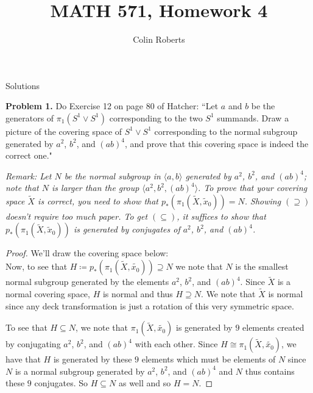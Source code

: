 \documentclass[leqno]{article}
\author{Colin Roberts}
\title{MATH 571, Homework 4}
\theoremstyle{nonumberplain}
\newtheorem{proof}{Proof}
\begin{document}
\maketitle
\begin{large}
\begin{center}
Solutions
\end{center}
\end{large}


\noindent\textbf{Problem 1.} 
Do Exercise 12 on page 80 of Hatcher: ``Let $a$ and $b$ be the generators of $\pi_1(S^1 \vee S^1)$ corresponding to the two $S^1$ summands. Draw a picture of the covering space of $S^1 \vee S^1$ corresponding to the normal subgroup generated by $a^2$, $b^2$, and $(ab)^4$, and prove that this covering space is indeed the correct one."

\emph{Remark: Let $N$ be the normal subgroup in $\langle a,b\rangle$ generated by $a^2$, $b^2$, and $(ab)^4$; note that $N$ is larger than the group $\langle a^2, b^2, (ab)^4 \rangle$. To prove that your covering space $\tilde{X}$ is correct, you need to show that $p_*(\pi_1(\tilde{X},\tilde{x}_0))=N$. Showing $(\supseteq)$ doesn't require too much paper. To get $(\subseteq)$, it suffices to show that $p_*(\pi_1(\tilde{X},\tilde{x}_0))$ is generated by conjugates of $a^2$, $b^2$, and $(ab)^4$.}



\begin{proof}
We'll draw the covering space below:
\vspace*{5cm}\\

Now, to see that $H\coloneqq p_*(\pi_1(\tilde{X},\tilde{x_0})) \supseteq N$ we note that $N$ is the smallest normal subgroup generated by the elements $a^2$, $b^2$, and $(ab)^4$.  Since $\tilde{X}$ is a normal covering space, $H$ is normal and thus $H\supseteq N$.  We note that $\tilde{X}$ is normal since any deck transformation is just a rotation of this very symmetric space.

To see that $H\subseteq N$, we note that $\pi_1(\tilde{X},\tilde{x_0})$ is generated by $9$ elements created by conjugating $a^2$, $b^2$, and $(ab)^4$ with each other. Since $H\cong \pi_1(\tilde{X},\tilde{x_0})$, we have that $H$ is generated by these $9$ elements which must be elements of $N$ since $N$ is a normal subgroup generated by $a^2$, $b^2$, and $(ab)^4$ and $N$ thus contains these $9$ conjugates.  So $H\subseteq N$ as well and so $H=N$.  
\end{proof}
\end{document}

